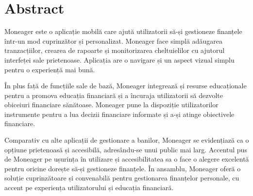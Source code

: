 \section*{Abstract}
\hspace{\parindent}\hspace{\parindent}Moneager este o aplicație mobilă care ajută utilizatorii să-și gestioneze finanțele într-un mod cuprinzător și personalizat. Moneager face simplă adăugarea tranzacțiilor, crearea de rapoarte și monitorizarea cheltuielilor cu ajutorul interfeței sale prietenoase. Aplicația are o navigare și un aspect vizual simplu pentru o experiență mai bună.

\hspace{\parindent}În plus față de funcțiile sale de bază, Moneager integrează și resurse educaționale pentru a promova educația financiară și a încuraja utilizatorii să dezvolte obiceiuri financiare sănătoase. Moneager pune la dispoziție utilizatorilor instrumente pentru a lua decizii financiare informate și a-și atinge obiectivele financiare.

\hspace{\parindent}Comparativ cu alte aplicații de gestionare a banilor, Moneager se evidențiază ca o opțiune prietenoasă și accesibilă, adresându-se unui public mai larg. Accentul pus de Moneager pe ușurința în utilizare și accesibilitatea sa o face o alegere excelentă pentru oricine dorește să-și gestioneze finanțele. În ansamblu, Moneager oferă o soluție cuprinzătoare și convenabilă pentru gestionarea finanțelor personale, cu accent pe experiența utilizatorului și educația financiară.